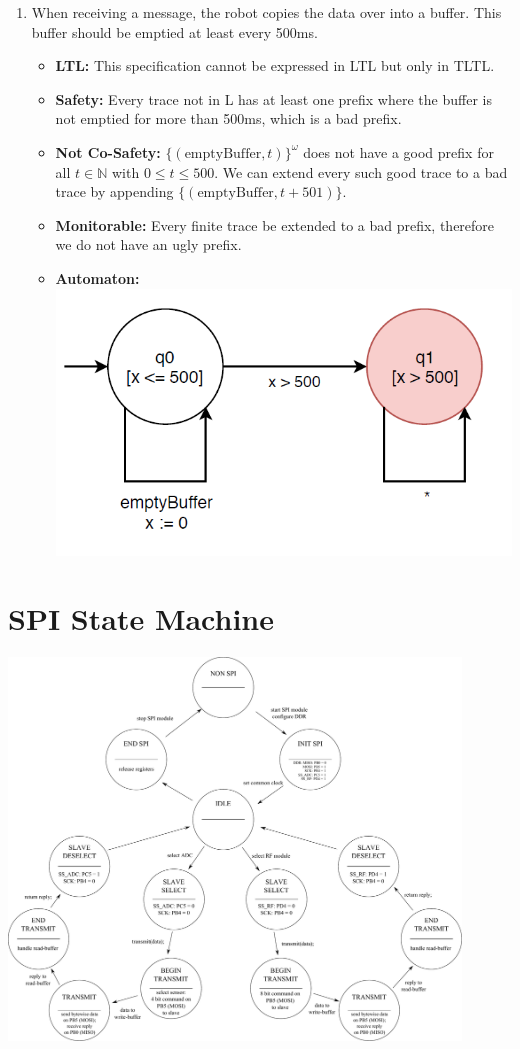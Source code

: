 \documentclass[12pt]{article}
\begin{document}
\begin{enumerate}
\item When receiving a message, the robot copies the data over into a buffer. This buffer should be emptied at least every 500ms.
	\begin{itemize}
		\item \textbf{LTL:} This specification cannot be expressed in LTL but only in TLTL.
		\item \textbf{Safety:} Every trace not in L has at least one prefix where the buffer is not emptied for more than 500ms, which is a bad prefix.
		\item \textbf{Not Co-Safety:} $\{( \text{emptyBuffer}, t)\}^ {\omega}$ does not have a good prefix for all $t \in \mathbb{N}$ with $0 \leq t \leq 500$. We can extend every such good trace to a bad trace by appending $\{( \text{emptyBuffer}, t + 501)\}$.
		\item \textbf{Monitorable:} Every finite trace be extended to a bad prefix, therefore we do not have an ugly prefix.
		\item \textbf{Automaton:} \\
			\includegraphics[scale = 0.5]{images/bufferAutomaton}
	\end{itemize}				

\end{enumerate}

\section*{SPI State Machine}

\includegraphics[width = 0.9\textwidth]{images/spi_state_machine_extended.pdf}
\end{document}

